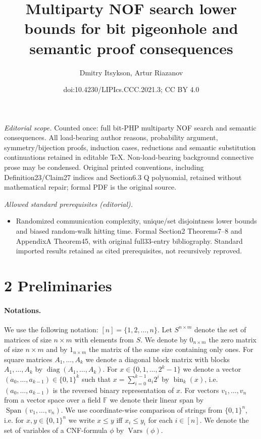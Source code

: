 \documentclass[10pt,a4paper]{article}
\title{Multiparty NOF search lower bounds for bit pigeonhole and semantic proof consequences}
\author{Dmitry Itsykson, Artur Riazanov}
\date{doi:10.4230/LIPIcs.CCC.2021.3; CC BY 4.0}
\begin{document}
\maketitle
\noindent\textit{Editorial scope.} Counted once: full bit-PHP multiparty NOF search and semantic consequences. All load-bearing author reasons, probability argument, symmetry/bijection proofs, induction cases, reductions and semantic substitution continuations retained in editable TeX. Non-load-bearing background connective prose may be condensed. Original printed conventions, including Definition23/Claim27 indices and Section6.3 Q polynomial, retained without mathematical repair; formal PDF is the original source.\par\medskip
\noindent\textit{Allowed standard prerequisites (editorial).}\begin{itemize}
\item Randomized communication complexity, unique/set disjointness lower bounds and biased random-walk hitting time. Formal Section2 Theorems7–8 and AppendixA Theorem45, with original full33-entry bibliography. Standard imported results retained as cited prerequisites, not recursively reproved.
\end{itemize}\medskip
\section*{2 Preliminaries}
\paragraph{Notations.} We use the following notation: $[n]=\{1,2,\ldots,n\}$. Let $S^{n\times m}$ denote the set of matrices of size $n\times m$ with elements from $S$. We denote by $0_{n\times m}$ the zero matrix of size $n\times m$ and by $1_{n\times m}$ the matrix of the same size containing only ones. For square matrices $A_1,\ldots,A_k$ we denote a diagonal block matrix with blocks $A_1,\ldots,A_k$ by $\operatorname{diag}(A_1,\ldots,A_k)$. For $x\in\{0,1,\ldots,2^k-1\}$ we denote a vector $(a_0,\ldots,a_{k-1})\in\{0,1\}^k$ such that $x=\sum_{i=0}^{k-1}a_i2^i$ by $\operatorname{bin}_k(x)$, i.e. $(a_0,\ldots,a_{k-1})$ is the reversed binary representation of $x$. For vectors $v_1,\ldots,v_n$ from a vector space over a field $\mathbb F$ we denote their linear span by $\operatorname{Span}(v_1,\ldots,v_n)$. We use coordinate-wise comparison of strings from $\{0,1\}^n$, i.e. for $x,y\in\{0,1\}^n$ we write $x\le y$ iff $x_i\le y_i$ for each $i\in[n]$. We denote the set of variables of a CNF-formula $\phi$ by $\operatorname{Vars}(\phi)$.
\end{document}
